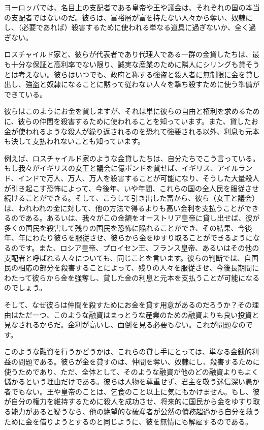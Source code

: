 \documentclass[dvipdfmx, uplatex, tate, landscape]{utbook}
\begin{document}
ヨーロッパでは、名目上の支配者である皇帝や王や議会は、それぞれの国の本当の支配者ではないのだ。彼らは、富裕層が富を持たない人々から奪い、奴隷にし、（必要であれば）殺害するために使われる単なる道具に過ぎないか、全く過ぎない。

ロスチャイルド家と、彼らが代表者であり代理人である一群の金貸したちは、最も十分な保証と高利率でない限り、誠実な産業のために隣人にシリングも貸そうとは考えない。彼らはいつでも、政府と称する強盗と殺人者に無制限に金を貸し出し、強盗と奴隷になることに黙って従わない人々を撃ち殺すために使う準備ができている。

彼らはこのようにお金を貸しますが、それは単に彼らの自由と権利を求めるために、彼らの仲間を殺害するために使われることを知っています。また、貸したお金が使われるような殺人が繰り返されるのを恐れて強要される以外、利息も元本も決して支払われないことも知っています。

例えば、ロスチャイルド家のような金貸したちは、自分たちでこう言っている。もし我々がイギリスの女王と議会に億ポンドを貸せば、イギリス、アイルランド、インドで万人、万人、万人を殺害することが可能になり、そうした大量殺人が引き起こす恐怖によって、今後年、いや年間、これらの国の全人民を服従させ続けることができる。そして、こうして引き出した富から、彼ら（女王と議会）は、われわれの金に対して、他の方法で得るよりも高い金利を支払うことができるのである。あるいは、我々がこの金額をオーストリア皇帝に貸し出せば、彼が多くの国民を殺害して残りの国民を恐怖に陥れることができ、その結果、今後年、年にわたり彼らを服従させ、彼らから金をゆすり取ることができるようになるのです。また、ロシア皇帝、プロイセン王、フランス皇帝、あるいはその他の支配者と呼ばれる人々についても、同じことを言います。彼らの判断では、自国民の相応の部分を殺害することによって、残りの人々を服従させ、今後長期間にわたって彼らから金を強奪し、貸した金の利息と元本を支払うことが可能になるのでしょう。

そして、なぜ彼らは仲間を殺すためにお金を貸す用意があるのだろうか？その理由はただ一つ、このような融資はまっとうな産業のための融資よりも良い投資と見なされるからだ。金利が高いし、面倒を見る必要もない。これが問題なのです。

このような融資を行うかどうかは、これらの貸し手にとっては、単なる金銭的利益の問題である。彼らが金を貸すのは、仲間を奪い、奴隷にし、殺害するために使うためであり、ただ、全体として、そのような融資が他のどの融資よりもよく儲かるという理由だけである。彼らは人物を尊重せず、君主を敬う迷信深い愚か者でもない。王や皇帝のことは、乞食のこと以上に気にもかけません。もし、彼が自分の権力を維持するために殺人を成功させ、将来的に国民から金をゆすり取る能力があると疑うなら、他の絶望的な破産者が公然の債務超過から自分を救うために金を借りようとするのと同じように、彼を無情にも解雇するのである。
\end{document}
